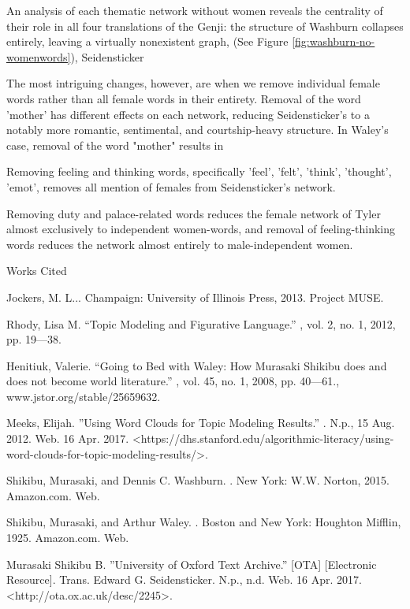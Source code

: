 \documentclass[12pt]{article}
\newcommand{\bibent}{\noindent \hangindent 40pt}
\newenvironment{workscited}{\newpage \begin{center} Works Cited \end{center}}{\newpage }
\begin{document}
\begin{flushleft}
\begin{spacing}{2.0}
An analysis of each thematic network without women reveals the centrality of their role in all four translations of the Genji: the structure of Washburn collapses entirely, leaving a virtually nonexistent graph, (See Figure \ref{fig:washburn-no-womenwords}), Seidensticker

The most intriguing changes, however, are when we remove individual female words rather than all female words in their entirety. Removal of the word 'mother' has different effects on each network, reducing Seidensticker's to a notably more romantic, sentimental, and courtship-heavy structure. In Waley's case, removal of the word "mother" results in

Removing feeling and thinking words, specifically 'feel', 'felt', 'think', 'thought', 'emot', removes all mention of females from Seidensticker's network.

Removing duty and palace-related words reduces the female network of Tyler almost exclusively to independent women-words, and removal of feeling-thinking words reduces the network almost entirely to male-independent women.
\begin{workscited}

\bibent Jockers, M. L... Champaign: University of Illinois Press, 2013. Project MUSE.

\bibent Rhody, Lisa M. ``Topic Modeling and Figurative Language.'' , vol. 2, no. 1, 2012, pp. 19---38.

\bibent Henitiuk, Valerie. ``Going to Bed with Waley: How Murasaki Shikibu does and does not become world literature.'' , vol. 45, no. 1, 2008, pp. 40---61., www.jstor.org/stable/25659632.

\bibent Meeks, Elijah. ''Using Word Clouds for Topic Modeling Results.'' . N.p., 15 Aug. 2012. Web. 16 Apr. 2017. <https://dhs.stanford.edu/algorithmic-literacy/using-word-clouds-for-topic-modeling-results/>.

\bibent Shikibu, Murasaki, and Dennis C. Washburn. . New York: W.W. Norton, 2015. Amazon.com. Web.

\bibent Shikibu, Murasaki, and Arthur Waley. . Boston and New York: Houghton Mifflin, 1925. Amazon.com. Web.

\bibent Murasaki Shikibu B. ''University of Oxford Text Archive.'' [OTA]  [Electronic Resource]. Trans. Edward G. Seidensticker. N.p., n.d. Web. 16 Apr. 2017. <http://ota.ox.ac.uk/desc/2245>.


\end{workscited}
\end{spacing}
\end{flushleft}
\end{document}
